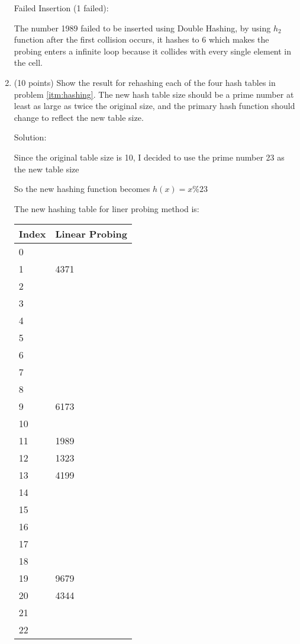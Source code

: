 \documentclass[12pt]{article}
\begin{document}
\begin{enumerate}
Failed Insertion (1 failed):

The number 1989 failed to be inserted using Double Hashing, by using $h_2$ function after the first collision occurs, it hashes to 6 which makes the probing enters a infinite loop because it collides with every single element in the cell.


\newpage
\item(10 points)  Show the result for rehashing each of the four hash tables in problem \ref{itm:hashing}. The new hash table size should be a prime number at least as large as twice the original size, and the primary hash function should change to reflect the new table size. 

Solution:

Since the original table size is 10, I decided to use the prime number 23 as the new table size

So the new hashing function becomes $h(x) = x\%23$

The new hashing table for liner probing method is:

\small{

	\begin{tabular}{| p{10mm}  | p{20mm} |}
	\hline
		Index & Linear Probing\\ \hline
		0 & \\ \hline
		1 & 4371 \\ \hline		
		2 & \\ \hline
		3 & \\ \hline
		4 & \\ \hline
		5 & \\ \hline 
		6 & \\ \hline
		7 & \\ \hline
		8 & \\ \hline
		9 & 6173\\ \hline
		10 & \\ \hline
		11 & 1989 \\ \hline
		12 & 1323 \\ \hline
		13 & 4199 \\ \hline
		14 & \\ \hline
		15 & \\ \hline
		16 & \\ \hline
		17 & \\ \hline
		18 & \\ \hline
		19 & 9679\\ \hline
		20 & 4344 \\ \hline
		21 & \\ \hline
		22 & \\ \hline
	\end{tabular}
}


\end{enumerate}
\end{document}
